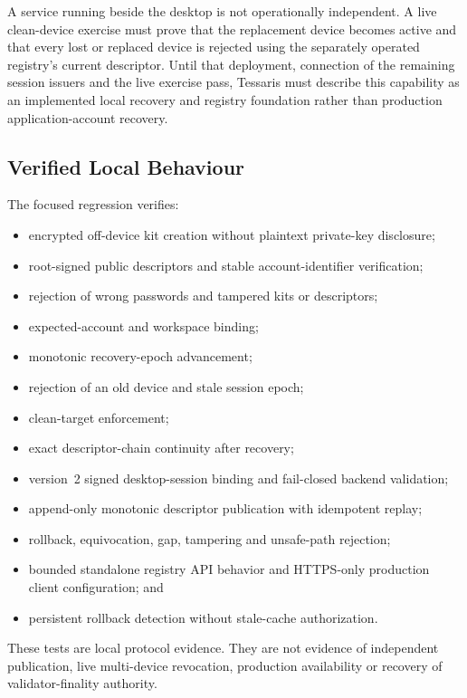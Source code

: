 A service running beside the desktop is not operationally independent.  A live
clean-device exercise must prove that the replacement device becomes active
and that every lost or replaced device is rejected using the separately
operated registry's current descriptor.  Until that deployment, connection of
the remaining session issuers and the live exercise pass, Tessaris must
describe this capability as an implemented local recovery and registry
foundation rather than production application-account recovery.

\subsection{Verified Local Behaviour}

The focused regression verifies:

\begin{itemize}[leftmargin=*]
  \item encrypted off-device kit creation without plaintext private-key
        disclosure;
  \item root-signed public descriptors and stable account-identifier
        verification;
  \item rejection of wrong passwords and tampered kits or descriptors;
  \item expected-account and workspace binding;
  \item monotonic recovery-epoch advancement;
  \item rejection of an old device and stale session epoch;
  \item clean-target enforcement;
  \item exact descriptor-chain continuity after recovery;
  \item version~2 signed desktop-session binding and fail-closed backend
        validation;
  \item append-only monotonic descriptor publication with idempotent replay;
  \item rollback, equivocation, gap, tampering and unsafe-path rejection;
  \item bounded standalone registry API behavior and HTTPS-only production
        client configuration; and
  \item persistent rollback detection without stale-cache authorization.
\end{itemize}

These tests are local protocol evidence.  They are not evidence of independent
publication, live multi-device revocation, production availability or recovery
of validator-finality authority.
